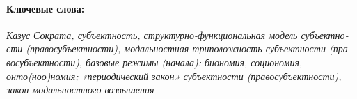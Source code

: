 \begin{russian}
    \paragraph{Ключевые слова:} {\itshape Казус Сократа, субъектность, структурно-функциональная модель субъектности (правосубъектности), модальностная триположность субъектности (правосубъектности), базовые режимы (начала): биономия, социономия, онто(ноо)номия; «периодический закон» субъектности (правосубъектности), закон модальностного возвышения}
    \end{russian}
\fi
